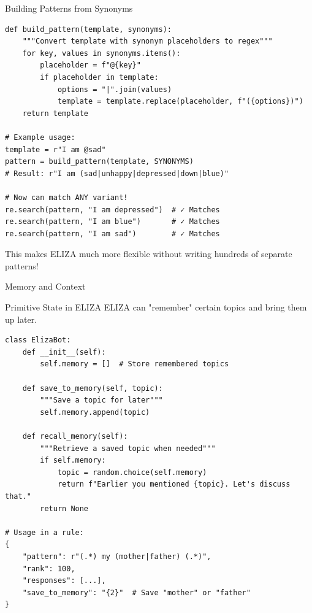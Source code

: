\documentclass[aspectratio=169]{beamer}
\begin{document}
\begin{frame}[fragile]{Building Patterns from Synonyms 🔨}
\begin{lstlisting}
def build_pattern(template, synonyms):
    """Convert template with synonym placeholders to regex"""
    for key, values in synonyms.items():
        placeholder = f"@{key}"
        if placeholder in template:
            options = "|".join(values)
            template = template.replace(placeholder, f"({options})")
    return template

# Example usage:
template = r"I am @sad"
pattern = build_pattern(template, SYNONYMS)
# Result: r"I am (sad|unhappy|depressed|down|blue)"

# Now can match ANY variant!
re.search(pattern, "I am depressed")  # ✓ Matches
re.search(pattern, "I am blue")       # ✓ Matches
re.search(pattern, "I am sad")        # ✓ Matches
\end{lstlisting}

\vspace{0.3cm}

\begin{thinkaboutit}
This makes ELIZA much more flexible without writing hundreds of separate patterns!
\end{thinkaboutit}
\end{frame}

\begin{frame}[fragile]{Memory and Context 🧠}
\begin{block}{Primitive State in ELIZA}
ELIZA can "remember" certain topics and bring them up later.
\end{block}

\vspace{0.3cm}

\begin{lstlisting}
class ElizaBot:
    def __init__(self):
        self.memory = []  # Store remembered topics

    def save_to_memory(self, topic):
        """Save a topic for later"""
        self.memory.append(topic)

    def recall_memory(self):
        """Retrieve a saved topic when needed"""
        if self.memory:
            topic = random.choice(self.memory)
            return f"Earlier you mentioned {topic}. Let's discuss that."
        return None

# Usage in a rule:
{
    "pattern": r"(.*) my (mother|father) (.*)",
    "rank": 100,
    "responses": [...],
    "save_to_memory": "{2}"  # Save "mother" or "father"
}
\end{lstlisting}
\end{frame}
\end{document}
